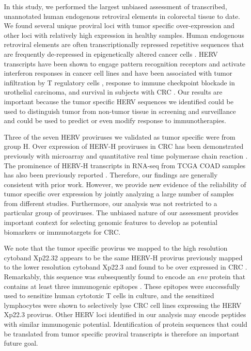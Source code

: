 In this study, we performed the largest unbiased assessment of transcribed, unannotated human endogenous retroviral elements in colorectal tissue to date.
We found several unique proviral loci with tumor specific over-expression and other loci with relatively high expression in healthy samples.
Human endogenous retroviral elements are often transcriptionally repressed repetitive sequences that are frequently de-repressed in epigenetically altered cancer cells \citep{Babaian2016}.
HERV transcripts have been shown to engage pattern recognition receptors and activate interferon responses in cancer cell lines \citep{Chiappinelli2015, Roulois2015} and have been associated with tumor infiltration by T regulatory cells \citep{Desai2017}, response to immune checkpoint blockade in urothelial carcinoma, and survival in subjects with CRC \citep{Solovyov2018}.
Our results are important because the tumor specific HERV sequences we identified could be used to distinguish tumor from non-tumor tissue in screening and surveillance and could be used to predict or even modify response to immunotherapies.

Three of the seven HERV proviruses we validated as tumor specific were from group H.
Over expression of HERV-H proviruses in CRC has been demonstrated previously with microarray \citep{Perot2012} and quantitative real time polymerase chain reaction \citep{Perot2015}.
The prominence of HERV-H transcripts in RNA-seq from TCGA COAD samples has also been previously reported \citep{Desai2017, Attig2019}.
Therefore, our findings are generally consistent with prior work.
However, we provide new evidence of the reliability of tumor specific over expression by jointly analyzing a large number of samples from different studies.
Furthermore, our analysis was not restricted to a particular group of proviruses.
The unbiased nature of our assessment provides important context for selecting genomic features to develop as potential biomarkers or immunotargets for CRC.

We note that the tumor specific provirus we mapped to the high resolution cytoband Xp22.32 appears to be the same HERV-H provirus previously mapped to the lower resolution cytoband Xp22.3 and found to be over expressed in CRC \citep{Wentzensen2007}.
Remarkably, this sequence was subsequently found to encode an \emph{env} protein that contains at least three immunogenic epitopes \citep{Mullins2012}.
These epitopes were successfully used to sensitize human cytotoxic T cells in culture, and the sensitized lymphocytes were shown to selectively lyse CRC cell lines expressing the HERV Xp22.3 provirus.
Other HERV loci identified in our analysis may encode peptides with similar immunogenic potential.
Identification of protein sequences that could be translated from tumor specific proviral transcripts is therefore an important future goal.

